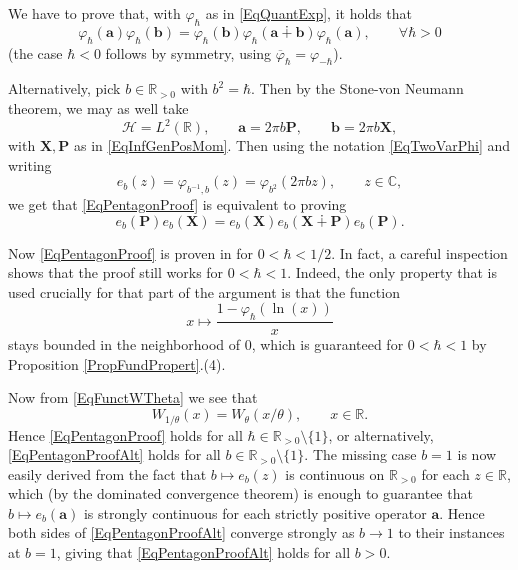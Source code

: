 \documentclass[11pt, reqno]{amsart}
\theoremstyle{definition}
\numberwithin{equation}{section}
\def\C{\mathbb C}
\def\R{\mathbb R}
\newcommand{\Hsp}{\mathcal{H}}
\newcommand{\Pb}{\mathbf{P}}
\newcommand{\Xb}{\mathbf{X}}
\begin{document}
We have to prove that, with $\varphi_{\hbar}$ as in \eqref{EqQuantExp}, it holds that
\begin{equation}\label{EqPentagonProof}
\varphi_{\hbar}(\mathbf{a})\varphi_{\hbar}(\mathbf{b}) = \varphi_{\hbar}(\mathbf{b})\varphi_{\hbar}(\mathbf{a}\dotplus \mathbf{b})\varphi_{\hbar}(\mathbf{a}),\qquad \forall \hbar>0 
\end{equation}
(the case $\hbar <0$ follows by symmetry, using $\overline{\varphi}_{\hbar} = \varphi_{-\hbar}$).

Alternatively, pick $b \in \R_{>0}$ with $b^2  = \hbar$. Then by the Stone-von Neumann theorem, we may as well take 
\begin{equation}\label{EqHeisPicSvN}
\Hsp = L^2(\R),\qquad \mathbf{a} = 2\pi b\Pb,\qquad \mathbf{b} = 2\pi b \Xb,
\end{equation}
with $\Xb,\Pb$ as in \eqref{EqInfGenPosMom}. Then using the notation \eqref{EqTwoVarPhi} and writing
\[
e_b(z) = \varphi_{b^{-1},b}(z) =  \varphi_{b^2}(2\pi bz),\qquad z\in \C,
\]
we get that \eqref{EqPentagonProof} is equivalent to proving
\begin{equation}\label{EqPentagonProofAlt}
e_b(\Pb)e_b(\Xb) = e_b(\Xb) e_b(\Xb\dotplus \Pb) e_b(\Pb). 
\end{equation}

Now \eqref{EqPentagonProof} is proven in \cite[Theorem 6.1]{Wor00} for $0<\hbar<1/2$. In fact, a careful inspection shows that the proof still works for $0<\hbar<1$. Indeed, the only property that is used crucially for that part of the argument is that the function 
\[
x \mapsto \frac{1-\varphi_{\hbar}(\ln(x))}{x}
\]
stays bounded in the neighborhood of $0$, which is guaranteed for $0<\hbar<1$ by Proposition \ref{PropFundPropert}.(4).

Now from  \eqref{EqFunctWTheta} we see that
\begin{equation}\label{EqFunctEquationW}
W_{1/\theta}(x) = W_{\theta}(x/\theta),\qquad x\in \R.
\end{equation}
Hence \eqref{EqPentagonProof} holds for all $\hbar\in \R_{>0}\setminus\{1\}$, or alternatively, \eqref{EqPentagonProofAlt} holds for all $b\in \R_{>0}\setminus\{1\}$. The missing case $b=1$ is now easily derived from the fact that $b \mapsto e_b(z)$ is continuous on $\R_{>0}$ for each $z\in \R$, which (by the dominated convergence theorem) is enough to guarantee that $b \mapsto e_b(\mathbf{a})$ is strongly continuous for each strictly positive operator $\mathbf{a}$. Hence both sides of \eqref{EqPentagonProofAlt} converge strongly as $b \rightarrow 1$ to their instances at $b=1$, giving that \eqref{EqPentagonProofAlt} holds for all $b>0$. 
\end{document}
